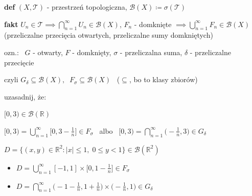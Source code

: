 \documentclass[a4paper,12pt]{article}
\begin{document}
\newpage
{}

\bigskip
\textbf{def} \; \((X, \mathcal{T})\) - przestrzeń topologiczna, \; \(\mathcal{B}(X) \coloneqq \sigma(\mathcal{T})\)

\smallskip
\textbf{fakt} \; \(U_n \in \mathcal{T} \implies \bigcap_{n=1}^{\infty} U_n \in \mathcal{B}(X)\), \; \(F_n\) - domknięte \(\implies \bigcup_{n=1}^{\infty} F_n \in \mathcal{B}(X)\) \, (przeliczalne przecięcia otwartych, przeliczalne sumy domkniętych)

\smallskip
ozn.: \, \(G\) - otwarty, \; \(F\) - domknięty, \; \(\sigma\) - przeliczalna suma, \; \(\delta\) - przeliczalne przecięcie

\smallskip
czyli \(G_\delta \subseteq \mathcal{B}(X), \;\; F_\sigma \subseteq \mathcal{B}(X)\) \, (\(\subseteq\), bo to klasy zbiorów)

\bigskip
{} \; uzasadnij, że:
\begin{podpunkty}
    \item \([0, 3) \in \mathcal{B}(\mathbb{R})\)

    \smallskip
    \([0, 3) = \bigcup_{n=1}^{\infty} \big[0, 3 - \frac{1}{n}\big] \in F_\sigma\) \, albo \, \([0, 3) = \bigcap_{n=1}^{\infty} \big(-\frac{1}{n}, 3\big) \in G_\delta\)
    \item \(D = \{(x, y) \in \mathbb{R}^2 : |x| \leq 1, \; 0 \leq y < 1\} \in \mathcal{B}(\mathbb{R}^2)\)

    \smallskip
    \begin{minipage}[c]{0.6\linewidth}
    \begin{itemize}
        \item \(D = \bigcup_{n=1}^{\infty} [-1, 1] \times \big[0, 1 - \frac{1}{n}\big] \in F_\sigma\)
        \item \(D = \bigcap_{n=1}^{\infty} \big(-1 - \frac{1}{n}, 1 + \frac{1}{n}\big) \times \big(-\frac{1}{n}, 1\big) \in G_\delta\)
    \end{itemize}
    \end{minipage}
    \hspace{1.5em}
\end{podpunkty}
\end{document}
